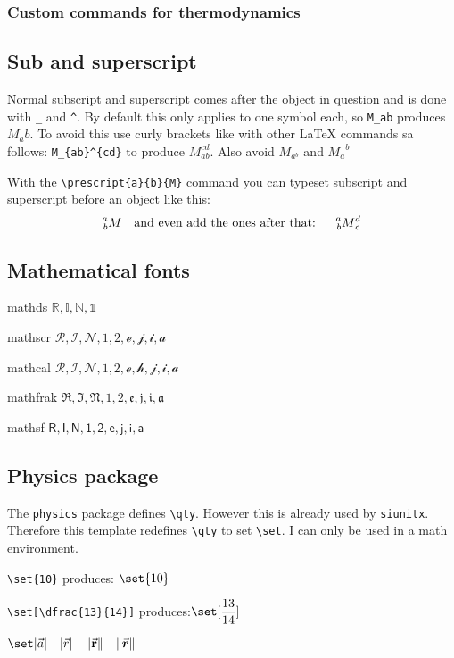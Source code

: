     \subsubsection{Custom commands for thermodynamics}


\subsection{Sub and superscript}
    Normal subscript and superscript comes after the object in question and is done with \texttt{\_} and \texttt{\^}. By default this only applies to one symbol each, so \verb|M_ab| produces $M_ab$. To avoid this use curly brackets like with other \LaTeX{} commands sa follows: \verb|M_{ab}^{cd}| to produce $M_{ab}^{cd}$. Also avoid $M_{a ^b}$ and ${M_a}^b$

    With the \verb|\prescript{a}{b}{M}| command you can typeset subscript and superscript before an object like this:
    \[  \prescript{a}{b}{M}
        \text{\quad and even add the ones after that: \quad}
        \prescript{a}{b}{M}_c^d \]

\subsection{Mathematical fonts}

    mathds $\mathds{R, I, N, 1}$

    mathscr $\mathscr{R, I, N, 1, 2, e, j, i, a}$

    mathcal $\mathcal{R, I, N, 1, 2, e,h, j, i, a}$

    mathfrak $\mathfrak{R, I, N, 1, 2, e, j, i, a}$

    mathsf $\mathsf{R, I, N, 1, 2, e, j, i, a}$

\subsection{Physics package}

    The \verb|physics| package defines \verb|\qty|. However this is already used by \texttt{siunitx}. Therefore this template redefines \verb|\qty| to set \verb|\set|. I can only be used in a math environment.


    \verb|\set{10}| produces: $\set{10}$

    \verb|\set[\dfrac{13}{14}]|     produces:$\set[\dfrac{13}{14}]$

    $\set|\vec{a}| \quad  \abs{\vec{r}} \quad \norm{\va{r}} \quad \norm{\va*{r}} $




